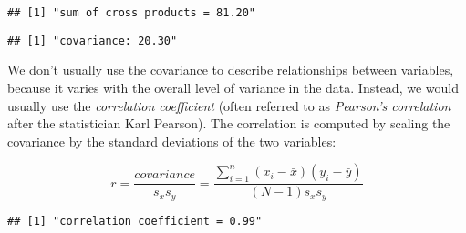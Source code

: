\documentclass[]{book}
\newenvironment{Shaded}{\begin{snugshade}}{\end{snugshade}}
\newcommand{\KeywordTok}[1]{\textcolor[rgb]{0.13,0.29,0.53}{\textbf{#1}}}
\newcommand{\DecValTok}[1]{\textcolor[rgb]{0.00,0.00,0.81}{#1}}
\newcommand{\StringTok}[1]{\textcolor[rgb]{0.31,0.60,0.02}{#1}}
\newcommand{\CommentTok}[1]{\textcolor[rgb]{0.56,0.35,0.01}{\textit{#1}}}
\newcommand{\OperatorTok}[1]{\textcolor[rgb]{0.81,0.36,0.00}{\textbf{#1}}}
\newcommand{\NormalTok}[1]{#1}
\theoremstyle{definition}
\theoremstyle{definition}
\theoremstyle{definition}
\theoremstyle{remark}
\begin{document}
\begin{verbatim}
## [1] "sum of cross products = 81.20"
\end{verbatim}

\begin{Shaded}
\end{Shaded}

\begin{verbatim}
## [1] "covariance: 20.30"
\end{verbatim}

We don't usually use the covariance to describe relationships between
variables, because it varies with the overall level of variance in the
data. Instead, we would usually use the \emph{correlation coefficient}
(often referred to as \emph{Pearson's correlation} after the
statistician Karl Pearson). The correlation is computed by scaling the
covariance by the standard deviations of the two variables:

\[
r = \frac{covariance}{s_xs_y} = \frac{\sum_{i=1}^n (x_i - \bar{x})(y_i - \bar{y})}{(N - 1)s_x s_y}
\]

\begin{Shaded}
\end{Shaded}

\begin{verbatim}
## [1] "correlation coefficient = 0.99"
\end{verbatim}
\end{document}
